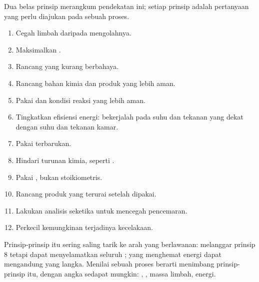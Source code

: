 Dua belas prinsip merangkum pendekatan ini; setiap prinsip adalah
pertanyaan yang perlu diajukan pada sebuah proses.
\begin{enumerate}
  \item Cegah limbah daripada mengolahnya.
  \item Maksimalkan .
  \item Rancang  yang kurang berbahaya.
  \item Rancang bahan kimia dan produk yang lebih aman.
  \item Pakai  dan kondisi reaksi yang lebih aman.
  \item Tingkatkan efisiensi energi: bekerjalah pada suhu dan tekanan
        yang dekat dengan suhu dan tekanan kamar.
  \item Pakai  terbarukan.
  \item Hindari turunan kimia, seperti .
  \item Pakai , bukan  stoikiometris.
  \item Rancang produk yang terurai setelah dipakai.
  \item Lakukan analisis seketika untuk mencegah pencemaran.
  \item Perkecil kemungkinan terjadinya kecelakaan.
\end{enumerate}

\begin{remark}\label{rem:g12:synthesis-strategy:principles}
Prinsip-prinsip itu sering saling tarik ke arah yang berlawanan:  melanggar prinsip 8 tetapi dapat menyelamatkan seluruh
;  yang menghemat energi dapat mengandung  yang
langka. Menilai sebuah proses berarti menimbang prinsip-prinsip itu,
dengan angka sedapat mungkin: , , massa limbah,
energi.
\end{remark}


